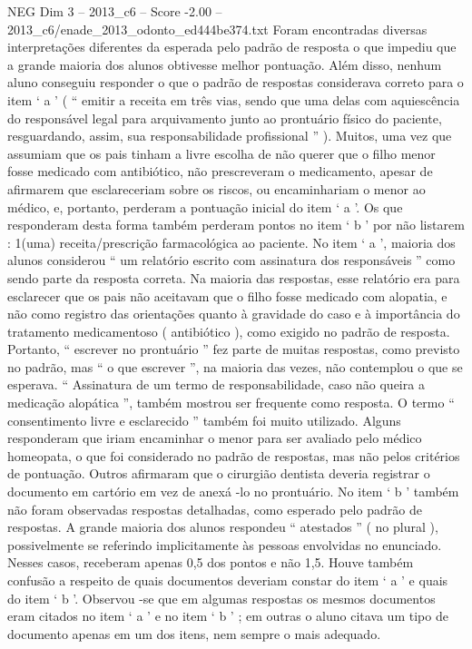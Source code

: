 \begin{textsample}{NEG Dim 3 – 2013\_c6 – Score -2.00 – 2013\_c6/enade\_2013\_odonto\_ed444be374.txt}
Foram encontradas diversas interpretações diferentes da esperada pelo padrão de resposta o que impediu que a grande maioria dos alunos obtivesse melhor pontuação.
Além disso, nenhum aluno conseguiu responder o que o padrão de respostas considerava correto para o item ‘ a ’ ( “ emitir a receita em três vias, sendo que uma delas com aquiescência do responsável legal para arquivamento junto ao prontuário físico do paciente, resguardando, assim, sua responsabilidade profissional ” ).
Muitos, uma vez que assumiam que os pais tinham a livre escolha de não querer que o filho menor fosse medicado com antibiótico, não prescreveram o medicamento, apesar de afirmarem que esclareceriam sobre os riscos, ou encaminhariam o menor ao médico, e, portanto, perderam a pontuação inicial do item ‘ a ’.
Os que responderam desta forma também perderam pontos no item ‘ b ’ por não listarem : 1(uma) receita/prescrição farmacológica ao paciente.
No item ‘ a ’, maioria dos alunos considerou “ um relatório escrito com assinatura dos responsáveis ” como sendo parte da resposta correta.
Na maioria das respostas, esse relatório era para esclarecer que os pais não aceitavam que o filho fosse medicado com alopatia, e não como registro das orientações quanto à gravidade do caso e à importância do tratamento medicamentoso ( antibiótico ), como exigido no padrão de resposta.
Portanto, “ escrever no prontuário ” fez parte de muitas respostas, como previsto no padrão, mas “ o que escrever ”, na maioria das vezes, não contemplou o que se esperava. “ Assinatura de um termo de responsabilidade, caso não queira a medicação alopática ”, também mostrou ser frequente como resposta.
O termo “ consentimento livre e esclarecido ” também foi muito utilizado.
Alguns responderam que iriam encaminhar o menor para ser avaliado pelo médico homeopata, o que foi considerado no padrão de respostas, mas não pelos critérios de pontuação.
Outros afirmaram que o cirurgião dentista deveria registrar o documento em cartório em vez de anexá -lo no prontuário.
No item ‘ b ’ também não foram observadas respostas detalhadas, como esperado pelo padrão de respostas.
A grande maioria dos alunos respondeu “ atestados ” ( no plural ), possivelmente se referindo implicitamente às pessoas envolvidas no enunciado.
Nesses casos, receberam apenas 0,5 dos pontos e não 1,5.
Houve também confusão a respeito de quais documentos deveriam constar do item ‘ a ’ e quais do item ‘ b ’.
Observou -se que em algumas respostas os mesmos documentos eram citados no item ‘ a ’ e no item ‘ b ’ ; em outras o aluno citava um tipo de documento apenas em um dos itens, nem sempre o mais adequado.

\end{textsample}
